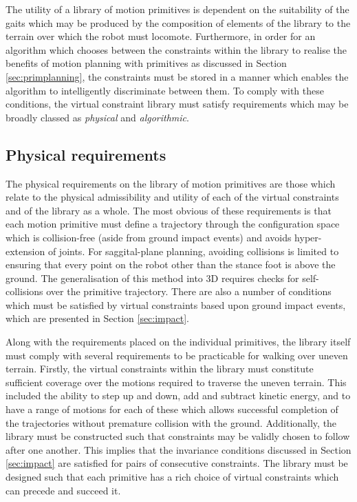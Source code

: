 The utility of a library of motion primitives is dependent on the suitability of the gaits which may be produced by the composition of elements of the library to the terrain over which the robot must locomote. Furthermore, in order for an algorithm which chooses between the constraints within the library to realise the benefits of motion planning with primitives as discussed in Section \ref{sec:primplanning}, the constraints must be stored in a manner which enables the algorithm to intelligently discriminate between them. To comply with these conditions, the virtual constraint library must satisfy requirements which may be broadly classed as \textit{physical} and \textit{algorithmic}.

\subsection{Physical requirements}
The physical requirements on the library of motion primitives are those which relate to the physical admissibility and utility of each of the virtual constraints and of the library as a whole. The most obvious of these requirements is that each motion primitive must define a trajectory through the configuration space which is collision-free (aside from ground impact events) and avoids hyper-extension of joints. For saggital-plane planning, avoiding collisions is limited to ensuring that every point on the robot other than the stance foot is above the ground. The generalisation of this method into 3D requires checks for self-collisions over the primitive trajectory. There are also a number of conditions which must be satisfied by virtual constraints based upon ground impact events, which are presented in Section \ref{sec:impact}.

Along with the requirements placed on the individual primitives, the library itself must comply with several requirements to be practicable for walking over uneven terrain. Firstly, the virtual constraints within the library must constitute sufficient coverage over the motions required to traverse the uneven terrain. This included the ability to step up and down, add and subtract kinetic energy, and to have a range of motions for each of these which allows successful completion of the trajectories without premature collision with the ground. Additionally, the library must be constructed such that constraints may be validly chosen to follow after one another. This implies that the invariance conditions discussed in Section \ref{sec:impact} are satisfied for pairs of consecutive constraints. The library must be designed such that each primitive has a rich choice of virtual constraints which can precede and succeed it.

